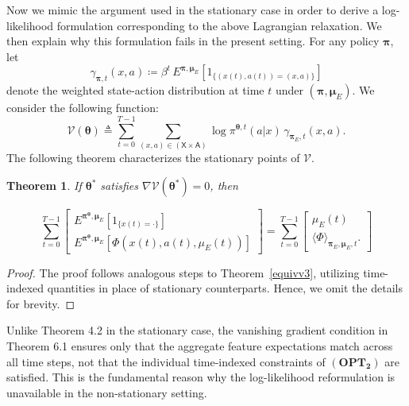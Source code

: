 \documentclass[11pt]{article}
\newcommand{\bmu}{{\boldsymbol \mu}}
\newcommand{\bpi}{{\boldsymbol \pi}}
\newcommand{\btheta}{{\boldsymbol \theta}}
\newcommand{\sX}{{\mathsf X}}
\newcommand{\sA}{{\mathsf A}}
\newcommand{\V}{{\mathcal V}}
\newtheorem{theorem}{Theorem}[section]
\begin{document}
Now we mimic the argument used in the stationary case in order to derive a log-likelihood formulation corresponding to the above Lagrangian relaxation. We then explain why this formulation fails in the present setting. For any policy $\bpi$, let 
$$
\gamma_{\bpi,t}(x,a) \coloneqq \beta^t \, E^{\bpi,\bmu_E} \left[ 1_{\{(x(t),a(t)) = (x,a)\}} \right]
$$
denote the weighted state-action distribution at time $t$ under $(\bpi,\bmu_E)$.
We consider the following function:
$$
\V(\btheta) \triangleq \sum_{t=0}^{T-1} \sum_{(x,a) \in (\sX\times\sA)} \log \pi^{\btheta,t}(a|x) \, \gamma_{\bpi_E,t}(x,a).
$$
The following theorem characterizes the stationary points of $\V$.

\begin{theorem}
If $\btheta^*$ satisfies $\nabla \V(\btheta^*) = 0$, then

$$\sum_{t=0}^{T-1} \begin{bmatrix}
E^{\bpi^{\btheta},\bmu_E} \left[ 1_{\{x(t) = \cdot\}} \right] \\ E^{\bpi^{\btheta},\bmu_E} \left[ \Phi(x(t),a(t),\mu_E(t)) \right]
\end{bmatrix} = \sum_{t=0}^{T-1}\begin{bmatrix}
\mu_E(t) \\ \langle \Phi \rangle_{\bpi_E,\bmu_E,t}.
\end{bmatrix}$$


\end{theorem}

\smallskip

\begin{proof}
 The proof follows analogous steps to Theorem~\ref{equivv3}, utilizing time-indexed quantities in place of stationary counterparts. Hence, we omit the details for brevity.
\end{proof}
 Unlike Theorem 4.2 in the stationary case, the vanishing gradient condition in Theorem 6.1 ensures only that the aggregate feature expectations match across all time steps, not that the individual time-indexed constraints of ${\mathbf{(OPT_2)}}$ are satisfied. This is the fundamental reason why the log-likelihood reformulation is unavailable in the non-stationary setting.
\end{document}
